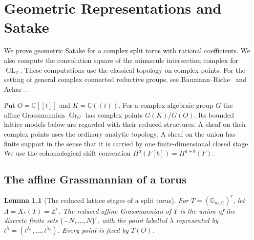\documentclass[11pt,oneside,openany]{book}
\newtheorem{lemma}[theorem]{Lemma}
\theoremstyle{definition}
\theoremstyle{remark}
\begin{document}
\chapter{Geometric Representations and Satake}

We prove geometric Satake for a complex split torus with rational
coefficients. We also compute the convolution square of the
minuscule intersection complex for \(\operatorname{GL}_2\).
These computations use the classical topology on complex points.
For the setting of general complex connected reductive groups, see
Baumann--Riche~\cite[Sections 6--9 and 13--14]{baumannriche}
and Achar~\cite[Chapter 9]{achar}.

Put \(O=\mathbb C[[t]]\) and \(K=\mathbb C((t))\).
For a complex algebraic group \(G\) the affine Grassmannian
\(\operatorname{Gr}_G\) has complex points \(G(K)/G(O)\).
Its bounded lattice models below are regarded with their reduced
structures. A sheaf on their complex points uses the ordinary
analytic topology. A sheaf on the union has finite support in the
sense that it is carried by one finite-dimensional closed stage.
We use the cohomological shift convention
\(H^a(F[b])=H^{a+b}(F)\).

\section{The affine Grassmannian of a torus}

\begin{lemma}[The reduced lattice stages of a split torus]
\label{res:GS01}
For \(T=(\mathbb G_{m,\mathbb C})^r\), let
\(\Lambda=X_*(T)=\mathbb Z^r\). The reduced affine Grassmannian
of \(T\) is the union of the discrete finite sets
\(\{-N,\ldots,N\}^r\), with the point labelled \(\lambda\)
represented by \(t^\lambda=(t^{\lambda_1},\ldots,t^{\lambda_r})\).
Every point is fixed by \(T(O)\).
\end{lemma}
\end{document}
